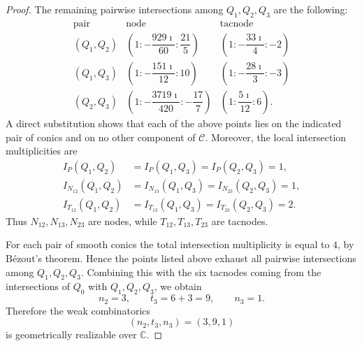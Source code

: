 \documentclass[10pt,a4paper]{amsart}
\begin{document}
\begin{proof}
The remaining pairwise intersections among \(Q_1,Q_2,Q_3\) are the following:
\[
\renewcommand{\arraystretch}{1.4}
\begin{array}{c|c|c}
\text{pair} & \text{node} & \text{tacnode}\\
\hline
(Q_1,Q_2)
&
\left(1:-\dfrac{929\imath}{60}:\dfrac{21}{5}\right)
&
\left(1:-\dfrac{33\imath}{4}:-2\right)
\\
(Q_1,Q_3)
&
\left(1:-\dfrac{151\imath}{12}:10\right)
&
\left(1:-\dfrac{28\imath}{3}:-3\right)
\\
(Q_2,Q_3)
&
\left(1:-\dfrac{3719\imath}{420}:-\dfrac{17}{7}\right)
&
\left(1:\dfrac{5\imath}{12}:6\right).
\end{array}
\]
A direct substitution shows that each of the above points lies on the indicated
pair of conics and on no other component of \(\mathcal C\). Moreover, the local
intersection multiplicities are
\[
\begin{aligned}
I_P(Q_1,Q_2)&=I_P(Q_1,Q_3)=I_P(Q_2,Q_3)=1,\\
I_{N_{12}}(Q_1,Q_2)&=I_{N_{13}}(Q_1,Q_3)=I_{N_{23}}(Q_2,Q_3)=1,\\
I_{T_{12}}(Q_1,Q_2)&=I_{T_{13}}(Q_1,Q_3)=I_{T_{23}}(Q_2,Q_3)=2.
\end{aligned}
\]
Thus \(N_{12},N_{13},N_{23}\) are nodes, while
\(T_{12},T_{13},T_{23}\) are tacnodes.

For each pair of smooth conics the total intersection multiplicity is equal to
\(4\), by B\'ezout's theorem. Hence the points listed above exhaust all pairwise
intersections among \(Q_1,Q_2,Q_3\). Combining this with the six tacnodes
coming from the intersections of \(Q_0\) with \(Q_1,Q_2,Q_3\), we obtain
\[
        n_2=3,\qquad t_3=6+3=9,\qquad n_3=1.
\]
Therefore the weak combinatorics
\[
        (n_2,t_3,n_3)=(3,9,1)
\]
is geometrically realizable over \(\mathbb C\).
\end{proof}
\end{document}
